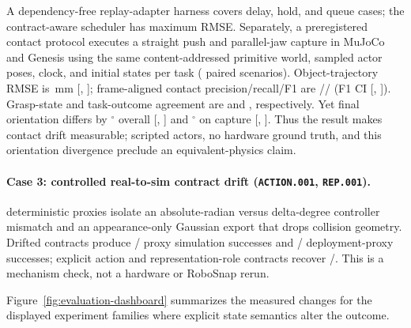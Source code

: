 A dependency-free replay-adapter harness covers \ExpAdapterConformanceCaseCount{} delay, hold, and
queue cases; the contract-aware scheduler has \ExpAdapterConformanceMaxError{} maximum RMSE.
Separately, a preregistered contact protocol executes a straight push and parallel-jaw capture in
MuJoCo and Genesis using the same content-addressed primitive world, sampled actor poses, clock, and
\ExpContactReplayScenariosPerTask{} initial states per task
(\ExpContactReplayScenarioCount{} paired scenarios). Object-trajectory RMSE is
\ExpContactReplayTrajectoryRmseMm{}\,mm
[\ExpContactReplayTrajectoryRmseCiLowMm, \ExpContactReplayTrajectoryRmseCiHighMm];
frame-aligned contact precision/recall/F1 are \ExpContactReplayPrecision/\ExpContactReplayRecall/
\ExpContactReplayFOne{} (F1 CI [\ExpContactReplayFOneCiLow, \ExpContactReplayFOneCiHigh]).
Grasp-state and task-outcome agreement are \ExpContactReplayGraspAgreement{} and
\ExpContactReplayOutcomeAgreement{}, respectively. Yet final orientation differs by
\ExpContactReplayFinalOrientationDeg$^\circ$ overall
[\ExpContactReplayFinalOrientationCiLowDeg, \ExpContactReplayFinalOrientationCiHighDeg] and
\ExpContactReplayCaptureOrientationDeg$^\circ$ on capture
[\ExpContactReplayCaptureOrientationCiLowDeg, \ExpContactReplayCaptureOrientationCiHighDeg].
Thus the result makes contact drift measurable; scripted actors, no hardware ground truth, and this
orientation divergence preclude an equivalent-physics claim.

\paragraph{Case 3: controlled real-to-sim contract drift (\texttt{ACTION.001}, \texttt{REP.001}).}
\ExpDriftAblationCount{} deterministic proxies isolate an absolute-radian versus delta-degree
controller mismatch and an appearance-only Gaussian export that drops collision geometry. Drifted
contracts produce \ExpDriftSimulationSuccessCount/\ExpDriftAblationCount{} proxy simulation
successes and
\ExpDriftDeploymentSuccessCount/\ExpDriftAblationCount{} deployment-proxy successes; explicit
action and representation-role contracts recover
\ExpDriftCorrectedSuccessCount/\ExpDriftAblationCount{}. This is a mechanism check, not a hardware
or RoboSnap rerun.

Figure~\ref{fig:evaluation-dashboard} summarizes the measured changes for the displayed experiment
families where explicit state semantics alter the outcome.

